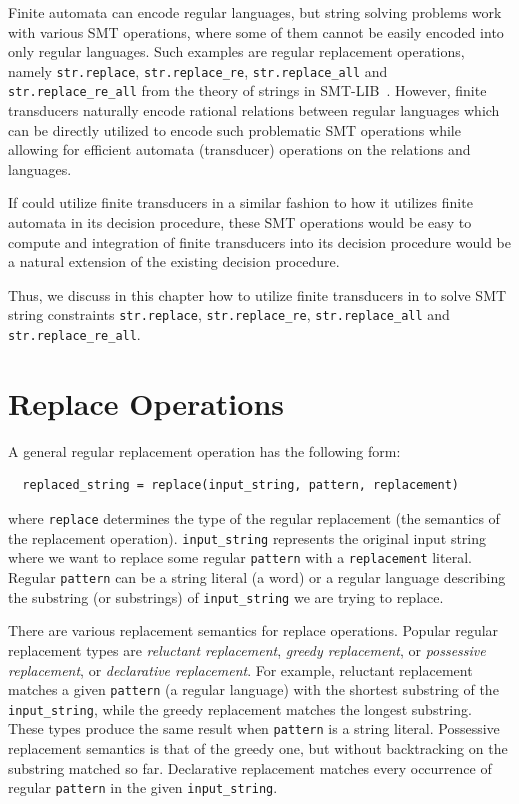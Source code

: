 Finite automata can encode regular languages, but string solving problems work with various SMT operations, where some of them cannot be easily encoded into only regular languages.
Such examples are regular replacement operations, namely \texttt{str.replace}, \texttt{str.replace\_re}, \texttt{str.replace\_all} and \texttt{str.replace\_re\_all} from the theory of strings in SMT-LIB~\cite{smtlib_theory_strings}.
However, finite transducers naturally encode rational relations between regular languages which can be directly utilized to encode such problematic SMT operations while allowing for efficient automata (transducer) operations on the relations and languages.

If \noodler could utilize finite transducers in a similar fashion to how it utilizes finite automata in its decision procedure, these SMT operations would be easy to compute and integration of finite transducers into its decision procedure would be a natural extension of the existing decision procedure.

Thus, we discuss in this chapter how to utilize finite transducers in \noodler to solve SMT string constraints \texttt{str.replace}, \texttt{str.replace\_re}, \texttt{str.replace\_all} and \texttt{str.replace\_re\_all}.

\section{Replace Operations}
A general regular replacement operation has the following form:
\begin{center}
\begin{verbatim}
  replaced_string = replace(input_string, pattern, replacement)
\end{verbatim}
\end{center}
where \texttt{replace} determines the type of the regular replacement (the semantics of the replacement operation).
\texttt{input\_string} represents the original input string where we want to replace some regular \texttt{pattern} with a \texttt{replacement} literal.
Regular \texttt{pattern} can be a string literal (a word) or a regular language describing the substring (or substrings) of \texttt{input\_string} we are trying to replace.

There are various replacement semantics for replace operations. Popular regular replacement types are \emph{reluctant replacement}, \emph{greedy replacement}, or \emph{possessive replacement}, or \emph{declarative replacement}.
For example, reluctant replacement matches a given \texttt{pattern} (a regular language) with the shortest substring of the \texttt{input\_string}, while the greedy replacement matches the longest substring. These types produce the same result when \texttt{pattern} is a string literal.
Possessive replacement semantics is that of the greedy one, but without backtracking on the substring matched so far.
Declarative replacement matches every occurrence of regular \texttt{pattern} in the given \texttt{input\_string}.


